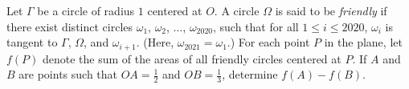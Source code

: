 Let $\Gamma$ be a circle of radius $1$ centered at $O$. A circle $\Omega$ is said to be \emph{friendly} if there exist distinct circles $\omega_1$, $\omega_2$, $\ldots$, $\omega_{2020}$, such that for all $1\le i\le2020$, $\omega_i$ is tangent to $\Gamma$, $\Omega$, and $\omega_{i+1}$. (Here, $\omega_{2021} = \omega_1$.) For each point $P$ in the plane, let $f(P)$ denote the sum of the areas of all friendly circles centered at $P$. If $A$ and $B$ are points such that $OA=\frac12$ and $OB=\frac13$, determine $f(A)-f(B)$.

